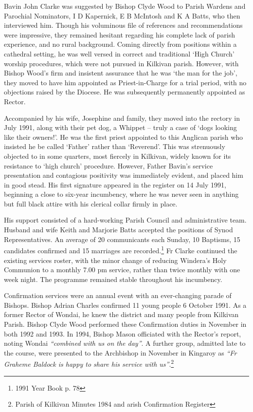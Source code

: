 Bavin John Clarke was suggested by Bishop Clyde Wood to Parish Wardens and Parochial Nominators, I D Kapernick, E B McIntosh and K A Batts, who then interviewed him. Though his voluminous file of references and recommendations were impressive, they remained hesitant regarding his complete lack of parish experience, and no rural background. Coming directly from positions within a cathedral setting, he was well versed in correct and traditional `High Church' worship procedures, which were not pursued in Kilkivan parish. However, with Bishop Wood's firm and insistent assurance that he was `the man for the job', they moved to have him appointed as Priest-in-Charge for a trial period, with no objections raised by the Diocese. He was subsequently permanently appointed as Rector.



Accompanied by his wife, Josephine and family, they moved into the rectory in July 1991, along with their pet dog, a Whippet -- truly a case of `dogs looking like their owners!'. He was the first priest appointed to this Anglican parish who insisted he be called `Father' rather than `Reverend'. This was strenuously objected to in some quarters, most fiercely in Kilkivan, widely known for its resistance to `high church' procedure. However, Father Bavin's service presentation and contagious positivity was immediately evident, and placed him in good stead. His first signature appeared in the register on 14 July 1991, beginning a close to six-year incumbency, where he was never seen in anything but full black attire with his clerical collar firmly in place.



His support consisted of a hard-working Parish Council and administrative team. Husband and wife Keith and Marjorie Batts accepted the positions of Synod Representatives. An average of 20 communicants each Sunday, 10 Baptisms, 15 candidates confirmed and 15 marriages are recorded.\footnote{1991 Year Book p. 78} Fr Clarke continued the existing services roster, with the minor change of reducing Windera's Holy Communion to a monthly 7.00 pm service, rather than twice monthly with one week night. The programme remained stable throughout his incumbency.


Confirmation services were an annual event with an ever-changing parade of Bishops. Bishop Adrian Charles confirmed 11 young people 6 October 1991. As a former Rector of Wondai, he knew the district and many people from Kilkivan Parish. Bishop Clyde Wood performed these Confirmation duties in November in both 1992 and 1993. In 1994, Bishop Mason officiated with the Rector's report, noting Wondai \emph{``combined with us on the day''}. A further group, admitted late to the course, were presented to the Archbishop in November in Kingaroy as \emph{``Fr Graheme Baldock is happy to share his service with us''}.\footnote{Parish of Kilkivan Minutes 1984 and arish Confirmation Register}


